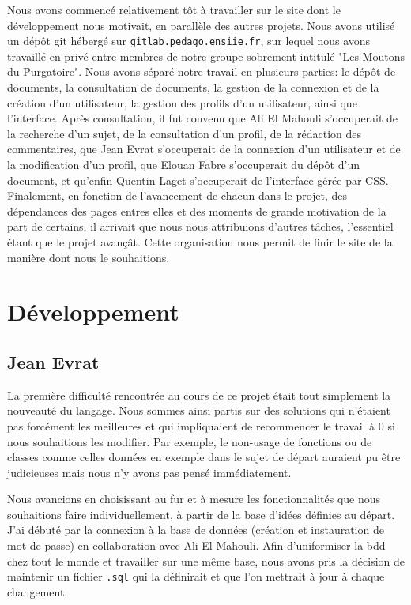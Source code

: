 \documentclass{article}
\begin{document}
Nous avons commencé relativement tôt à travailler sur le site dont le développement nous motivait, en parallèle des autres projets. Nous avons utilisé un dépôt git hébergé sur \texttt{gitlab.pedago.ensiie.fr}, sur lequel nous avons travaillé en privé entre membres de notre groupe sobrement intitulé "Les Moutons du Purgatoire". Nous avons séparé notre travail en plusieurs parties: le dépôt de documents, la consultation de documents, la gestion de la connexion et de la création d'un utilisateur, la gestion des profils d'un utilisateur, ainsi que l'interface. Après consultation, il fut convenu que Ali El Mahouli s'occuperait de la recherche d'un sujet, de la consultation d'un profil, de la rédaction des commentaires, que Jean Evrat s'occuperait de la connexion d'un utilisateur et de la modification d'un profil, que Elouan Fabre s'occuperait du dépôt d'un document, et qu'enfin Quentin Laget s'occuperait de l'interface gérée par CSS. Finalement, en fonction de l'avancement de chacun dans le projet, des dépendances des pages entres elles et des moments de grande motivation de la part de certains, il arrivait que nous nous attribuions d'autres tâches, l'essentiel étant que le projet avançât. Cette organisation nous permit de finir le site de la manière dont nous le souhaitions.


\section*{Développement}

\subsection*{Jean Evrat}

La première difficulté rencontrée au cours de ce projet était tout simplement la nouveauté du langage. Nous sommes ainsi partis sur des solutions qui n'étaient pas forcément les meilleures et qui impliquaient de recommencer le travail à 0 si nous souhaitions les modifier. Par exemple, le non-usage de fonctions ou de classes comme celles données en exemple dans le sujet de départ auraient pu être judicieuses mais nous n'y avons pas pensé immédiatement.

Nous avancions en choisissant au fur et à mesure les fonctionnalités que nous souhaitions faire individuellement, à partir de la base d'idées définies au départ. J'ai débuté par la connexion à la base de données (création et instauration de mot de passe) en collaboration avec Ali El Mahouli.  Afin d'uniformiser la bdd chez tout le monde et travailler sur une même base, nous avons pris la décision de maintenir un fichier \texttt{.sql} qui la définirait et que l'on mettrait à jour à chaque changement.
\end{document}
